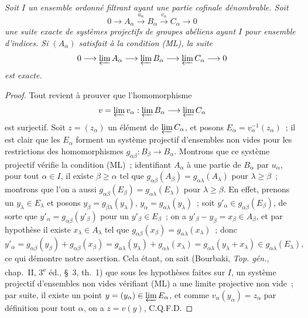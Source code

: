 \begin{proposition}[13.2.2]
\label{0.13.2.2-fr}
\emph{Soit $I$ un ensemble ordonné filtrant ayant une partie cofinale
dénombrable. Soit}
\[
0\longrightarrow A_\alpha\xrightarrow{u_\alpha}B_\alpha
\xrightarrow{v_\alpha}C_\alpha\longrightarrow0
\]
\emph{une suite exacte de systèmes projectifs de groupes abéliens ayant
$I$ pour ensemble d'indices. Si $(A_\alpha)$ satisfait à la condition
(ML), la suite}
\[
0\longrightarrow\varprojlim A_\alpha
\longrightarrow\varprojlim B_\alpha
\longrightarrow\varprojlim C_\alpha\longrightarrow0
\]
\emph{est exacte.}
\end{proposition}

\begin{proof}
Tout revient à prouver que l'homomorphisme
\[
v=\varprojlim v_\alpha:\varprojlim B_\alpha\longrightarrow
\varprojlim C_\alpha
\]
est surjectif. Soit $z=(z_\alpha)$ un élément de
$\varprojlim C_\alpha$, et posons
$E_\alpha=v_\alpha^{-1}(z_\alpha)$~; il est clair que les $E_\alpha$
forment un système projectif d'ensembles non vides pour les restrictions
des homomorphismes $g_{\alpha\beta}:B_\beta\to B_\alpha$. Montrons que ce
système projectif vérifie la condition (ML)~; identifiant $A_\alpha$ à une
partie de $B_\alpha$ par $u_\alpha$, pour tout $\alpha\in I$, il existe
$\beta\geq\alpha$ tel que
$g_{\alpha\beta}(A_\beta)=g_{\alpha\lambda}(A_\lambda)$ pour
$\lambda\geq\beta$~; montrons que l'on a aussi
$g_{\alpha\beta}(E_\beta)=g_{\alpha\lambda}(E_\lambda)$ pour
$\lambda\geq\beta$. En effet, prenons un $y_\lambda\in E_\lambda$ et
posons $y_\beta=g_{\beta\lambda}(y_\lambda)$,
$y_\alpha=g_{\alpha\lambda}(y_\lambda)$~; soit
$y'_\alpha\in g_{\alpha\beta}(E_\beta)$, de sorte que
$y'_\alpha=g_{\alpha\beta}(y'_\beta)$ pour un $y'_\beta\in E_\beta$~;
on a $y'_\beta-y_\beta=x_\beta\in A_\beta$, et par hypothèse il existe
$x_\lambda\in A_\lambda$ tel que
$g_{\alpha\beta}(x_\beta)=g_{\alpha\lambda}(x_\lambda)$~; donc
\[
y'_\alpha=g_{\alpha\beta}(y_\beta)+g_{\alpha\beta}(x_\beta)
=g_{\alpha\lambda}(y_\lambda)+g_{\alpha\lambda}(x_\lambda)
=g_{\alpha\lambda}(y_\lambda+x_\lambda)
\in g_{\alpha\lambda}(E_\lambda),
\]
ce qui démontre notre assertion. Cela étant, on sait (Bourbaki,
\emph{Top. gén.}, chap.~II, 3\textsuperscript{e} éd., §~3, th.~1) que sous
les hypothèses faites sur $I$, un système projectif d'ensembles non vides
vérifiant (ML) a une limite projective non vide~; par suite, il existe un
point $y=(y_\alpha)\in\varprojlim E_\alpha$, et comme
$v_\alpha(y_\alpha)=z_\alpha$ par définition pour tout $\alpha$, on a
$z=v(y)$, C.Q.F.D.
\end{proof}

